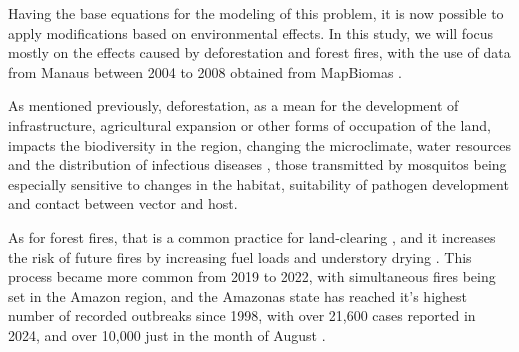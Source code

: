 \documentclass[a4paper,fleqn]{cas-dc}
\begin{document}
Having the base equations for the modeling of this problem, it is now possible to apply modifications based on environmental effects. In this study, we will focus mostly on the effects caused by deforestation and forest fires, with the use of data from Manaus between 2004 to 2008 obtained from MapBiomas \cite{MapBIOMAS_Deforestation, MapBIOMAS_Forest_Fires}. 

As mentioned previously, deforestation, as a mean for the development of infrastructure, agricultural expansion or other forms of occupation of the land, impacts the biodiversity in the region, changing the microclimate, water resources and the distribution of infectious diseases \cite{Reconstructing_Three_Decades, Amazon_Defor_Drives_Malaria_Transmis}, those transmitted by mosquitos being especially sensitive to changes in the habitat, suitability of pathogen development and contact between vector and host.

As for forest fires, that is a common practice for land-clearing \cite{Future_of_Deforestation}, and it increases the risk of future fires by increasing fuel loads and understory drying \cite{Conservation_Policy}. This process became more common from 2019 to 2022, with simultaneous fires being set in the Amazon region, and the Amazonas state has reached it's highest number of recorded outbreaks since 1998, with over 21,600 cases reported in 2024, and over 10,000 just in the month of August \cite{Threats_and_Opportunities, G1_Queimadas}.
\end{document}
